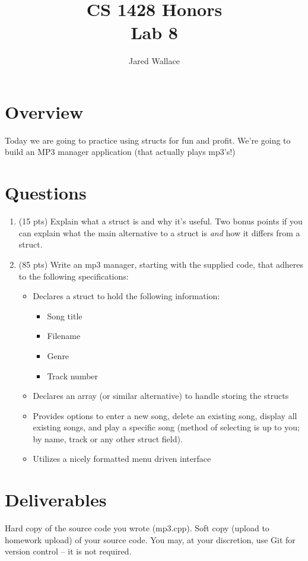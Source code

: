 \documentclass[letterpaper,12pt]{article}
\title{\Large CS 1428 Honors\\Lab 8}
\author{Jared Wallace}
\date{}
\begin{document}
\maketitle

\vspace{30mm}

\section*{Overview}
Today we are going to practice using structs for fun and profit. We're
going to build an MP3 manager application (that actually plays mp3's!)
\section*{Questions}
\begin{enumerate}
    \item (15 pts) Explain what a struct is and why it's useful. Two bonus points if
        you can explain what the main alternative to a struct is \emph{and} how
        it differs from a struct.
    \vspace{40mm}
    \item (85 pts) Write an mp3 manager, starting with the supplied code, that
        adheres to the following specifications:
    \begin{itemize}
        \item Declares a struct to hold the following information:
            \begin{itemize}
                \item Song title
                \item Filename
                \item Genre
                \item Track number
            \end{itemize}
        \item Declares an array (or similar alternative) to handle storing the structs
        \item Provides options to enter a new song, delete an existing song, display
            all existing songs, and play a specific song (method of selecting is up to you;
            by name, track or any other struct field).
        \item Utilizes a nicely formatted menu driven interface
    \end{itemize}
\end{enumerate}
\section*{Deliverables}
Hard copy of the source code you wrote (mp3.cpp). Soft copy (upload to homework upload) of
your source code. You may, at your discretion, use Git for version control -- it is not required.
\end{document}

